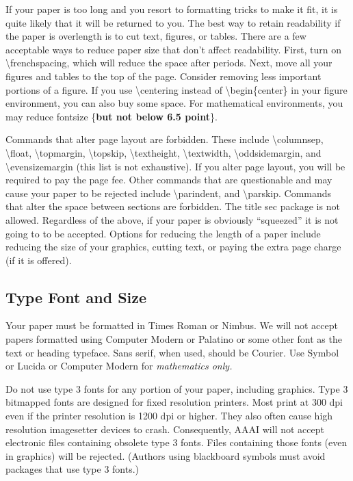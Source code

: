If your paper is too long and you resort to formatting tricks to make it
fit, it is quite likely that it will be returned to you. The best way to
retain readability if the paper is overlength is to cut text, figures,
or tables. There are a few acceptable ways to reduce paper size that
don't affect readability. First, turn on \textbackslash frenchspacing,
which will reduce the space after periods. Next, move all your figures
and tables to the top of the page. Consider removing less important
portions of a figure. If you use \textbackslash centering instead of
\textbackslash begin\{center\} in your figure environment, you can also
buy some space. For mathematical environments, you may reduce fontsize
\{\textbf{but not below 6.5 point}\}.

Commands that alter page layout are forbidden. These include
\textbackslash columnsep, \textbackslash float,
\textbackslash topmargin, \textbackslash topskip,
\textbackslash textheight, \textbackslash textwidth,
\textbackslash oddsidemargin, and \textbackslash evensizemargin (this
list is not exhaustive). If you alter page layout, you will be required
to pay the page fee. Other commands that are questionable and may cause
your paper to be rejected include \textbackslash parindent, and
\textbackslash parskip. Commands that alter the space between sections
are forbidden. The title sec package is not allowed. Regardless of the
above, if your paper is obviously ``squeezed'' it is not going to to be
accepted. Options for reducing the length of a paper include reducing
the size of your graphics, cutting text, or paying the extra page charge
(if it is offered).

\subsection{Type Font and Size}

Your paper must be formatted in Times Roman or Nimbus. We will not
accept papers formatted using Computer Modern or Palatino or some other
font as the text or heading typeface. Sans serif, when used, should be
Courier. Use Symbol or Lucida or Computer Modern for
\textit{mathematics only. }

Do not use type 3 fonts for any portion of your paper, including
graphics. Type 3 bitmapped fonts are designed for fixed resolution
printers. Most print at 300 dpi even if the printer resolution is 1200
dpi or higher. They also often cause high resolution imagesetter devices
to crash. Consequently, AAAI will not accept electronic files containing
obsolete type 3 fonts. Files containing those fonts (even in graphics)
will be rejected. (Authors using blackboard symbols must avoid packages
that use type 3 fonts.)

